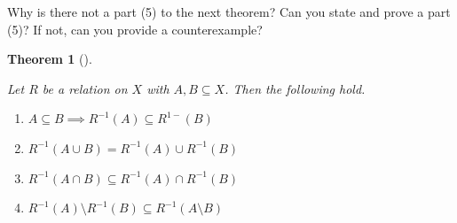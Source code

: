 \documentclass[
  letterpaper,
  10pt,
  reqno,
  twopage,
  openany]{book}
\providecommand{\tightlist}{%
  \setlength{\itemsep}{0pt}\setlength{\parskip}{0pt}}\usepackage{longtable,booktabs,array}
\theoremstyle{plain}
\theoremstyle{definition}
\theoremstyle{definition}
\theoremstyle{definition}
\theoremstyle{plain}
\theoremstyle{plain}
\newtheorem{theorem}{Theorem}[chapter]
\theoremstyle{remark}
\begin{document}
Why is there not a part (5) to the next theorem? Can you state and prove
a part (5)? If not, can you provide a counterexample?

\leavevmode{}%
\begin{theorem}[]\label{thm-relations-preimage}

Let \(R\) be a relation on \(X\) with \(A, B\subseteq X\). Then the
following hold.

\begin{enumerate}
\def\labelenumi{\arabic{enumi}.}
\tightlist
\item
  \(A\subseteq B \implies R^{-1}(A)\subseteq R^{1-}(B)\)
\item
  \(R^{-1}(A\cup B)=R^{-1}(A)\cup R^{-1}(B)\)
\item
  \(R^{-1}(A\cap B)\subseteq R^{-1}(A)\cap R^{-1}(B)\)
\item
  \(R^{-1}(A)\setminus R^{-1}(B)\subseteq R^{-1}(A\setminus B)\)
\end{enumerate}

\end{theorem}
\end{document}
